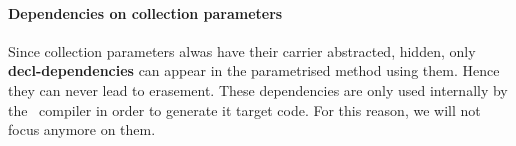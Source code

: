 \paragraph{Dependencies on collection parameters}
Since collection parameters alwas have their carrier abstracted,
hidden, only {\bf decl-dependencies} can appear in the parametrised
method using them. Hence they can never lead to erasement. These
dependencies are only used internally by the \focal\ compiler in order
to generate it target code. For this reason, we will not focus anymore
on them.
